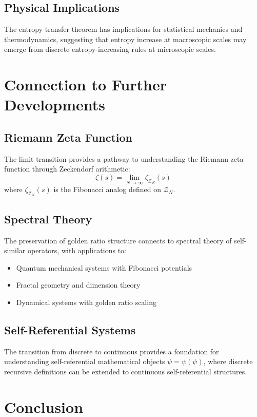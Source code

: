 \documentclass[12pt]{article}
\theoremstyle{plain}
\theoremstyle{definition}
\begin{document}
\subsection{Physical Implications}

The entropy transfer theorem has implications for statistical mechanics and thermodynamics, suggesting that entropy increase at macroscopic scales may emerge from discrete entropy-increasing rules at microscopic scales.

\section{Connection to Further Developments}

\subsection{Riemann Zeta Function}
The limit transition provides a pathway to understanding the Riemann zeta function through Zeckendorf arithmetic:
$$\zeta(s) = \lim_{N \to \infty} \zeta_{\mathcal{Z}_N}(s)$$
where $\zeta_{\mathcal{Z}_N}(s)$ is the Fibonacci analog defined on $\mathcal{Z}_N$.

\subsection{Spectral Theory}
The preservation of golden ratio structure connects to spectral theory of self-similar operators, with applications to:
\begin{itemize}
\item Quantum mechanical systems with Fibonacci potentials
\item Fractal geometry and dimension theory
\item Dynamical systems with golden ratio scaling
\end{itemize}

\subsection{Self-Referential Systems}
The transition from discrete to continuous provides a foundation for understanding self-referential mathematical objects $\psi = \psi(\psi)$, where discrete recursive definitions can be extended to continuous self-referential structures.

\section{Conclusion}
\end{document}

